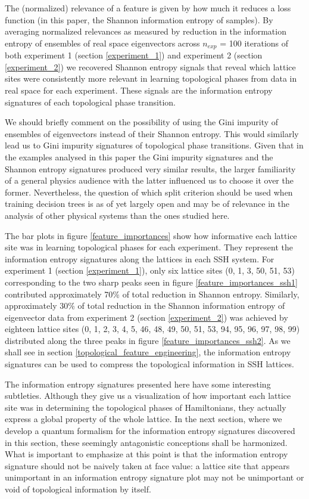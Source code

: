 \documentclass[10pt]{revtex4-1}
\begin{document}
The (normalized) relevance of a feature is given by how much it reduces a loss function (in this paper, the Shannon information entropy of samples). By averaging normalized relevances as measured by reduction in the information entropy of ensembles of real space eigenvectors across $n_{exp}$ = 100 iterations of both experiment 1 (section \ref{experiment_1}) and experiment 2 (section \ref{experiment_2}) we recovered Shannon entropy signals that reveal which lattice sites were consistently more relevant in learning topological phases from data in real space for each experiment. These signals are the information entropy signatures of each topological phase transition. 

We should briefly comment on the possibility of using the Gini impurity of ensembles of eigenvectors \cite{friedman2001elements} instead of their Shannon entropy. This would similarly lead us to Gini impurity signatures of topological phase transitions. Given that in the examples analysed in this paper the Gini impurity signatures and the Shannon entropy signatures produced very similar results, the larger familiarity of a general physics audience with the latter influenced us to choose it over the former. Nevertheless, the question of which split criterion  should be used when training decision trees is as of yet largely open \cite{raileanu2004theoretical} and may be of relevance in the analysis of other physical systems than the ones studied here.       

The bar plots in figure \ref{feature_importances} show how informative each lattice site was in learning topological phases for each experiment. They represent the information entropy signatures along the lattices in each SSH system. For experiment 1 (section \ref{experiment_1}), only six lattice sites (0, 1, 3, 50, 51, 53) corresponding to the two sharp peaks seen in figure \ref{feature_importances_ssh1} contributed approximately 70\% of total reduction in Shannon entropy. Similarly, approximately 30\% of total reduction in the Shannon information entropy of eigenvector data from experiment 2 (section \ref{experiment_2}) was achieved by eighteen lattice sites (0, 1, 2, 3, 4, 5, 46, 48, 49, 50, 51, 53, 94, 95, 96, 97, 98, 99) distributed along the three peaks in figure \ref{feature_importances_ssh2}. As we shall see in section \ref{topological_feature_engineering}, the information entropy signatures can be used to compress the topological information in SSH lattices.

The information entropy signatures presented here have some interesting subtleties. Although they give us a visualization of how important each lattice site was in determining the topological phases of Hamiltonians, they actually express a global property of the whole lattice. In the next section, where we develop a quantum formalism for the information entropy signatures discovered in this section, these seemingly antagonistic conceptions shall be harmonized. What is important to emphasize at this point is that the information entropy signature should not be naively taken at face value: a lattice site that appears unimportant in an information entropy signature plot may not be unimportant or void of topological information by itself.
\end{document}
